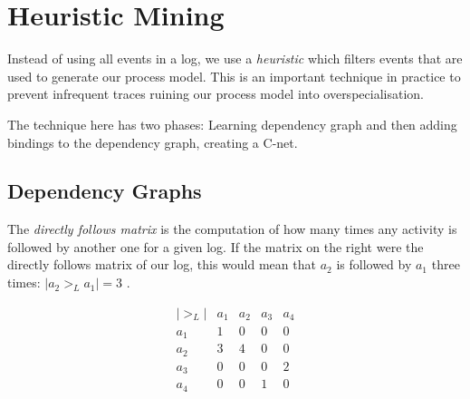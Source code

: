 \documentclass[english]{panikzettel}
\begin{document}
\begin{center}
    \end{center}

\section{Heuristic Mining}

Instead of using all events in a log, we use a \emph{heuristic} which filters events that are used to generate our process model.
This is an important technique in practice to prevent infrequent traces ruining our process model into overspecialisation.

The technique here has two phases: Learning dependency graph and then adding bindings to the dependency graph, creating a C-net.

\subsection{Dependency Graphs}

\begin{halfboxl}
The \emph{directly follows matrix} is the computation of how many times any activity is followed by another one for a given log.
If the matrix on the right were the directly follows matrix of our log, this would mean that $a_2$ is followed by $a_1$ three times: $|a_2 >_L a_1| = 3$ .
\end{halfboxl}%
\begin{halfboxr}
\vspace{-\baselineskip}
    \[\begin{array}{c|c|c|c|c}
    |>_L| & a_1   & a_2   & a_3   & a_4   \\ \hline
    a_1 & 1     & 0     & 0     & 0     \\ \hline
    a_2 & 3     & 4     & 0     & 0     \\ \hline
    a_3 & 0     & 0     & 0     & 2     \\ \hline
    a_4 & 0     & 0     & 1     & 0     \\
\end{array}\]
\end{halfboxr}
\end{document}
